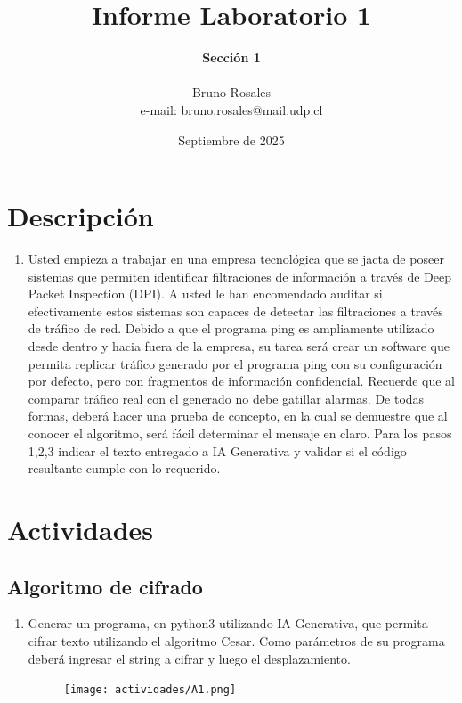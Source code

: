 \documentclass[letter,12pt]{article}
\begin{document}
%
   \title{\Huge{Informe Laboratorio 1}}

   \author{\textbf{Sección 1} \\  \\Bruno Rosales \\ e-mail: bruno.rosales@mail.udp.cl}
          
   \date{Septiembre de 2025}

   \maketitle
   
   \tableofcontents
 
  \newpage

\section{Descripción}
\label{seccion descripcion}
\begin{enumerate}
    \item  Usted empieza a trabajar en una empresa tecnológica que se jacta de poseer sistemas que permiten identificar filtraciones de información a través de Deep Packet Inspection (DPI).
    A usted le han encomendado auditar si efectivamente estos sistemas son capaces de detectar las filtraciones a través de tráfico de red. Debido a que el programa ping es ampliamente utilizado desde dentro y hacia fuera de la empresa, su tarea será crear un software que permita replicar tráfico generado por el programa ping con su configuración por defecto, pero con fragmentos de información confidencial. Recuerde que al comparar tráfico real con el generado no debe gatillar alarmas.
    De todas formas, deberá hacer una prueba de concepto, en la cual se demuestre que al conocer el algoritmo, será fácil determinar el mensaje en claro.
    Para los pasos 1,2,3 indicar el texto entregado a IA Generativa y validar si el código resultante cumple con lo requerido.
\end{enumerate}

\section{Actividades}
\label{seccion actividades}
\subsection{Algoritmo de cifrado}
\label{actividad 1}
\begin{enumerate}
\item Generar un programa, en python3 utilizando IA Generativa, que permita cifrar texto utilizando el algoritmo Cesar. Como parámetros de su programa deberá ingresar el string a cifrar y luego el desplazamiento.

\begin{figure}[H]
        \centering
        \texttt{[image: actividades/A1.png]}
        \label{fig:a1}
\end{figure}

\end{enumerate}
\end{document}

